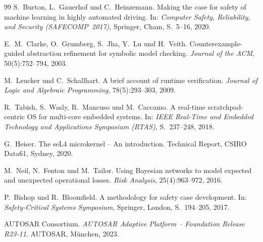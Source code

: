 ﻿\documentclass[a4paper,12pt]{article}
\theoremstyle{definition}
\begin{document}
\begin{thebibliography}{99}
S.~Burton, L.~Gauerhof und C.~Heinzemann.
\newblock Making the case for safety of machine learning in
  highly automated driving.
\newblock In: \textit{Computer Safety, Reliability, and Security
  (SAFECOMP~2017)}, Springer, Cham, S.~5--16, 2020.

E.~M.~Clarke, O.~Grumberg, S.~Jha, Y.~Lu und H.~Veith.
\newblock Counterexample-guided abstraction refinement for
  symbolic model checking.
\newblock \textit{Journal of the ACM}, 50(5):752--794, 2003.

M.~Leucker und C.~Schallhart.
\newblock A brief account of runtime verification.
\newblock \textit{Journal of Logic and Algebraic Programming},
  78(5):293--303, 2009.

R.~Tabish, S.~Wasly, R.~Mancuso und M.~Caccamo.
\newblock A real-time scratchpad-centric OS for multi-core
  embedded systems.
\newblock In: \textit{IEEE Real-Time and Embedded Technology
  and Applications Symposium (RTAS)}, S.~237--248, 2018.

G.~Heiser.
\newblock The seL4 microkernel -- An introduction.
\newblock Technical Report, CSIRO Data61, Sydney, 2020.

M.~Neil, N.~Fenton und M.~Tailor.
\newblock Using Bayesian networks to model expected and
  unexpected operational losses.
\newblock \textit{Risk Analysis}, 25(4):963--972, 2016.

P.~Bishop und R.~Bloomfield.
\newblock A methodology for safety case development.
\newblock In: \textit{Safety-Critical Systems Symposium},
  Springer, London, S.~194--205, 2017.

AUTOSAR Consortium.
\newblock \textit{AUTOSAR Adaptive Platform -- Foundation
  Release R23-11}.
\newblock AUTOSAR, München, 2023.

\end{thebibliography}
\end{document}
